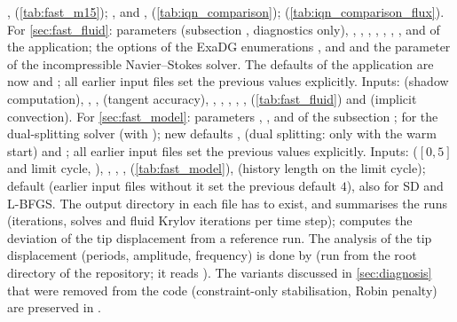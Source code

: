 \documentclass[11pt,a4paper]{article}
\theoremstyle{definition}
\theoremstyle{remark}
\begin{document}
,  (\cref{tab:fast_m15}); ,  and
,  (\cref{tab:iqn_comparison}); 
(\cref{tab:iqn_comparison_flux}). For
\cref{sec:fast_fluid}: parameters  (subsection ,
diagnostics only), , ,
, , ,
, , 
and  of the application; the options  of the ExaDG
enumerations ,  and
 and the parameter  of the
incompressible Navier--Stokes solver. The defaults of the application are now
 and ; all earlier
input files set the previous values explicitly. Inputs:  (shadow computation),
, ,  (tangent accuracy), , ,
, , , 
(\cref{tab:fast_fluid}) and  (implicit convection). For \cref{sec:fast_model}:
parameters , ,  and
 of the subsection ; 
for the dual-splitting solver (with );
new defaults ,  (dual splitting:
only with the warm start) and ; all earlier input files
set the previous values explicitly. Inputs:  ($[0,5]$ and limit cycle, ),
, , ,  (\cref{tab:fast_model}),
 (history length on the limit cycle); default  (earlier input
files without it set the previous default $4$),  also for SD and L-BFGS.
The output directory in each file has to exist, and
 summarises the runs (iterations, solves and fluid
Krylov iterations per time step);  computes the
deviation of the tip displacement from a reference run.
The analysis of the tip displacement (periods, amplitude, frequency) is
done by  (run from the root directory of the
repository; it reads ).
The variants discussed in \cref{sec:diagnosis} that were removed from the code (constraint-only
stabilisation, Robin penalty) are preserved in .
\end{document}
